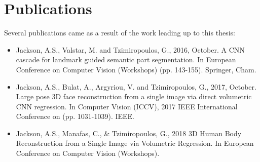 \section{Publications}

Several publications came as a result of the work leading up to this
thesis:

\begin{itemize}
\item Jackson, A.S., Valstar, M. and Tzimiropoulos, G., 2016,
  October. A CNN cascade for landmark guided semantic part
  segmentation. In European Conference on Computer Vision (Workshops)
  (pp. 143-155). Springer, Cham.

\item Jackson, A.S., Bulat, A., Argyriou, V. and Tzimiropoulos, G.,
  2017, October. Large pose 3D face reconstruction from a single
  image via direct volumetric CNN regression. In Computer Vision
  (ICCV), 2017 IEEE International Conference on
  (pp. 1031-1039). IEEE.

\item Jackson, A.S., Manafas, C., \& Tzimiropoulos, G., 2018 3D
  Human Body Reconstruction from a Single Image via Volumetric
  Regression. In European Conference on Computer Vision (Workshops).
\end{itemize}

